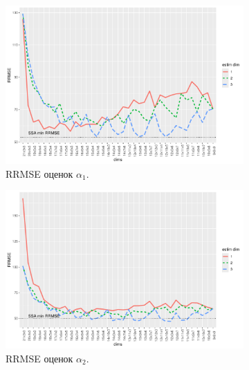 \documentclass[specialist,
  substylefile=spbu_report.rtx,
subf,href,colorlinks=true, 12pt]{disser}
\theoremstyle{plain}
\theoremstyle{definition}
\theoremstyle{remark}
\begin{document}
\begin{figure}[!ht]
  \centering
  \begin{subfigure}{0.49\linewidth}
    \includegraphics[width=\linewidth, height=0.167\textheight]{rate1_dims_large_eq_rates.pdf}
    \caption{RRMSE оценок $\alpha_1$.}
    \label{fig:rate1_dims_large_eq_rates}
  \end{subfigure}
  \begin{subfigure}{0.49\linewidth}
    \includegraphics[width=\linewidth, height=0.167\textheight]{rate2_dims_large_eq_rates.pdf}
    \caption{RRMSE оценок $\alpha_2$.}
    \label{fig:rate2_dims_large_eq_rates}
  \end{subfigure}
  \begin{subfigure}{0.49\linewidth}

\end{subfigure}
\end{figure}
\end{document}
